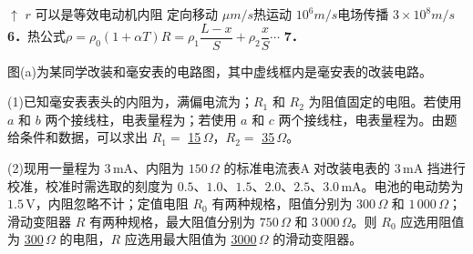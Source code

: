 $\uparrow$ %
$r$ 可以是等效电动机内阻
定向移动 $\mu\unit{m/s}$\quad 热运动 $10^6\unit{m/s}$\quad 电场传播 $3\times10^8\unit{m/s}$
\textbf{6．}热公式\quad $\rho=\rho_0(1+\alpha T)$\quad $R=\rho_1\dfrac{L-x}{S}+\rho_2\dfrac{x}{S}\cdots$
\textbf{7．} %
\begin{problem}[剪贴印刷题·9分]
图(a)为某同学改装和毫安表的电路图，其中虚线框内是毫安表的改装电路。%

(1)已知毫安表表头的内阻为，满偏电流为；$R_1$ 和 $R_2$ 为阻值固定的电阻。若使用 $a$ 和 $b$ 两个接线柱，电表量程为；若使用 $a$ 和 $c$ 两个接线柱，电表量程为。由题给条件和数据，可以求出 $R_1=$ \underline{\hspace{0.6em}15\hspace{0.6em}}\,$\Omega$，$R_2=$ \underline{\hspace{0.6em}35\hspace{0.6em}}\,$\Omega$。%

(2)现用一量程为 $3\,\mathrm{mA}$、内阻为 $150\,\Omega$ 的标准电流表\textcircled{A}对改装电表的 $3\,\mathrm{mA}$ 挡进行校准，校准时需选取的刻度为 $0.5$、$1.0$、$1.5$、$2.0$、$2.5$、$3.0\,\mathrm{mA}$。电池的电动势为 $1.5\,\mathrm{V}$，内阻忽略不计；定值电阻 $R_0$ 有两种规格，阻值分别为 $300\,\Omega$ 和 $1\,000\,\Omega$；滑动变阻器 $R$ 有两种规格，最大阻值分别为 $750\,\Omega$ 和 $3\,000\,\Omega$。则 $R_0$ 应选用阻值为 \underline{\hspace{0.4em}300\hspace{0.4em}}\,$\Omega$ 的电阻，$R$ 应选用最大阻值为 \underline{\hspace{0.6em}3000\hspace{0.6em}}\,$\Omega$ 的滑动变阻器。%


\end{problem}
